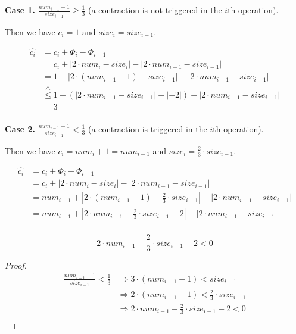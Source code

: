\textbf{Case 1.}
$\frac{num_{i-1}-1}{size_{i-1}} \geq \frac{1}{3}$
(a contraction is not triggered in the $i$th operation).

Then we have $c_i = 1$ and $size_i = size_{i-1}$.

\begin{equation*}
\begin{split}
    \hat{c_i} & = c_i + \Phi_i - \Phi_{i-1} \\
    & = c_i + | 2 \cdot num_i - size_i | - | 2 \cdot num_{i-1} - size_{i-1} | \\
    & = 1 + | 2 \cdot (num_{i-1} - 1) - size_{i-1} | - | 2 \cdot num_{i-1} - size_{i-1} | \\
    & \overset{\triangle}{\leq} 1 + (| 2 \cdot num_{i-1} - size_{i-1} | + | - 2 |) 
        - | 2 \cdot num_{i-1} - size_{i-1} | \\
    & = 3 \\
\end{split}
\end{equation*}

\textbf{Case 2.}
$\frac{num_{i-1}-1}{size_{i-1}} < \frac{1}{3}$
(a contraction is triggered in the $i$th operation).

Then we have $c_i = num_i + 1 = num_{i-1}$ and $size_i = \frac{2}{3} \cdot size_{i-1}$.

\begin{equation*}
\begin{split}
    \hat{c_i} & = c_i + \Phi_i - \Phi_{i-1} \\
    & = c_i + | 2 \cdot num_i - size_i | - | 2 \cdot num_{i-1} - size_{i-1} | \\
    & = num_{i-1} + | 2 \cdot (num_{i-1} - 1) - \frac{2}{3} \cdot size_{i-1} | 
        - | 2 \cdot num_{i-1} - size_{i-1} | \\
    & = num_{i-1} + | 2 \cdot num_{i-1} - \frac{2}{3} \cdot size_{i-1} - 2 | 
        - | 2 \cdot num_{i-1} - size_{i-1} | \\
\end{split}
\end{equation*}

\begin{lemma}
    \begin{equation*}
        2 \cdot num_{i-1} - \frac{2}{3} \cdot size_{i-1} - 2 < 0
    \end{equation*}
\end{lemma}

\begin{proof}
    \begin{equation*}
    \begin{split}
        \frac{num_{i-1}-1}{size_{i-1}} < \frac{1}{3}
        & \Longrightarrow 3 \cdot (num_{i-1} - 1) < size_{i-1} \\
        & \Longrightarrow 2 \cdot (num_{i-1} - 1) < \frac{2}{3} \cdot size_{i-1} \\
        & \Longrightarrow 2 \cdot num_{i-1} - \frac{2}{3} \cdot size_{i-1} - 2 < 0 \\
    \end{split}
    \end{equation*}
\end{proof}


